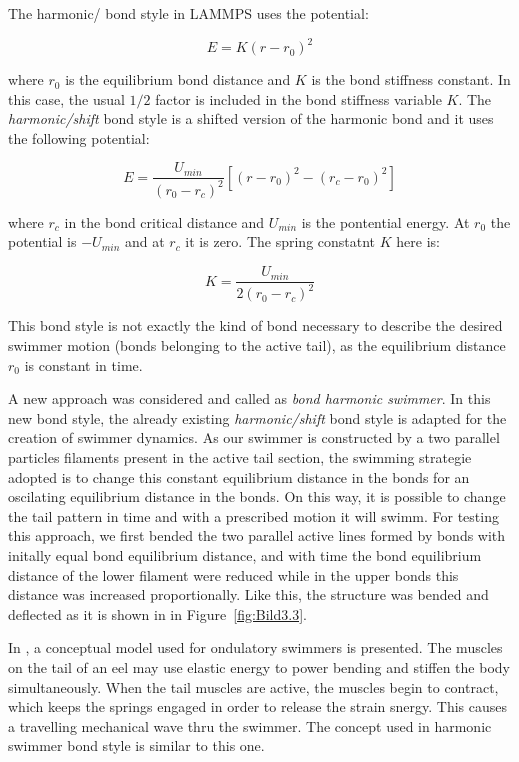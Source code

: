 The harmonic/ bond style in LAMMPS uses the potential:

\begin{equation} 
  E = K ( r - r_{0})^2
\end{equation}

where $r_{0}$ is the equilibrium bond distance and $K$ is the bond stiffness constant. In this case, the usual $1/2$ factor is included in the bond stiffness variable $K$. 
The \textit{harmonic/shift} bond style is a shifted version of the harmonic bond and it uses the following potential:

\begin{equation} 
  E = \frac{U_{min}}{( r_{0} - r_{c})^2} [( r - r_{0})^2 -( r_{c} - r_{0})^2]
\end{equation}

where $r_{c}$ in the bond critical distance and $U_{min}$ is the pontential energy. At $r_{0}$ the potential is $-U_{min}$ and at $r_{c}$ it is zero. The spring constatnt $K$
here is:

\begin{equation} 
  K = \frac{U_{min}}{2( r_{0} - r_{c})^2} 
\end{equation}

This bond
style is not exactly the kind of bond necessary to describe the desired swimmer motion (bonds belonging to the active tail), as the equilibrium distance $r_{0}$ is constant in 
time.\par

A new approach was considered and called as \textit{bond harmonic swimmer}. In this new bond style, the already existing \textit{harmonic/shift} bond style is adapted for the creation of
swimmer dynamics. As our swimmer is constructed by a two parallel particles filaments present in the active tail section, the swimming strategie adopted is to change this constant
equilibrium distance in the bonds for an oscilating equilibrium distance in the bonds. On this way, it is possible to change the tail pattern in time and with a prescribed  motion
it will swimm. For testing this approach, we first bended the two parallel active lines formed by bonds with initally equal bond equilibrium distance, and with time the bond equilibrium
distance of the lower filament were reduced while in the upper bonds this distance was increased proportionally. Like this, the structure was bended and deflected as it is shown in 
in Figure~\ref{fig:Bild3.3}.\par
In \cite{long_muscles_1998}, a conceptual model used for ondulatory swimmers is presented. The muscles on the tail of an eel may use elastic energy to power bending and stiffen the 
body simultaneously. When the tail muscles are active, the muscles begin to contract, which keeps the springs engaged in order to release the strain snergy. This causes a travelling
mechanical wave thru the swimmer. The concept used in harmonic swimmer bond style is similar to this one.


